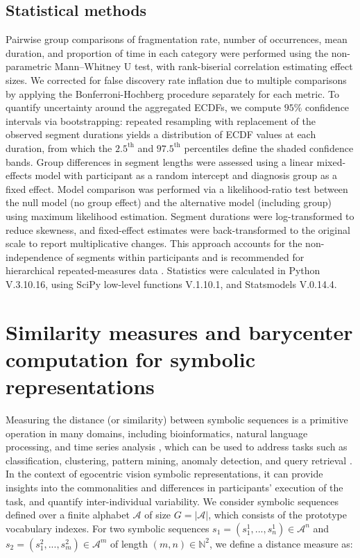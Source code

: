 \begin{chapterabstract}
    \subsection{Statistical methods}
        Pairwise group comparisons of fragmentation rate, number of occurrences, mean duration, and proportion of time in each category were performed using the non-parametric Mann–Whitney U test, with rank-biserial correlation estimating effect sizes. We corrected for false discovery rate inflation due to multiple comparisons by applying the Bonferroni-Hochberg procedure separately for each metric. To quantify uncertainty around the aggregated ECDFs, we compute $95\%$ confidence intervals via bootstrapping: repeated resampling with replacement of the observed segment durations yields a distribution of ECDF values at each duration, from which the $2.5^{\text{th}}$ and $97.5^{\text{th}}$ percentiles define the shaded confidence bands. Group differences in segment lengths were assessed using a linear mixed-effects model with participant as a random intercept and diagnosis group as a fixed effect. Model comparison was performed via a likelihood-ratio test between the null model (no group effect) and the alternative model (including group) using maximum likelihood estimation. Segment durations were log-transformed to reduce skewness, and fixed-effect estimates were back-transformed to the original scale to report multiplicative changes. This approach accounts for the non-independence of segments within participants and is recommended for hierarchical repeated-measures data \cite{Gelman2006, BAAYEN2008390}. Statistics were calculated in Python V.3.10.16, using SciPy low-level functions V.1.10.1, and Statsmodels V.0.14.4.



\section{Similarity measures and barycenter computation for symbolic representations}
    \label{sec:chapter_6_similarity_measure}
        
    Measuring the distance (or similarity) between symbolic sequences is a primitive operation in many domains, including bioinformatics, natural language processing, and time series analysis \cite{combettes_these}, which can be used to address tasks such as classification, clustering, pattern mining, anomaly detection, and query retrieval \cite{Esling2012}. In the context of egocentric vision symbolic representations, it can provide insights into the commonalities and differences in participants' execution of the task, and quantify inter-individual variability. We consider symbolic sequences defined over a finite alphabet $\mathcal{A}$ of size $G = |\mathcal{A}|$, which consists of the prototype vocabulary indexes. For two symbolic sequences $s_1=(s^1_{1}, ..., s^1_{n}) \in \mathcal{A}^n$ and $s_2=(s^2_{1}, ..., s^2_{m}) \in \mathcal{A}^m$ of length $(m, n)\in \mathbb{N}^2$, we define a distance measure as:


\end{chapterabstract}
